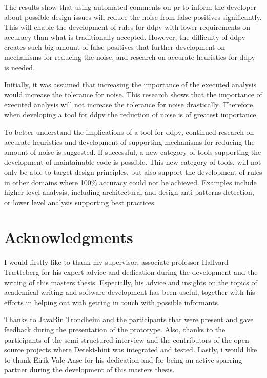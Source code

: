 \documentclass[pdftex,10pt,b5paper,twoside]{report}
\begin{document}
The results show that using automated comments on \gls{pr} to inform the developer about possible design issues will reduce the noise from false-positives significantly. This will enable the development of rules for \gls{ddpv} with lower requirements on accuracy than what is traditionally accepted. However, the difficulty of \gls{ddpv} creates such big amount of false-positives that further development on mechanisms for reducing the noise, and research on accurate heuristics for \gls{ddpv} is needed.

Initially, it was assumed that increasing the importance of the executed analysis would increase the tolerance for noise. This research shows that the importance of executed analysis will not increase the tolerance for noise drastically. Therefore, when developing a tool for \gls{ddpv} the reduction of noise is of greatest importance. 

To better understand the implications of a tool for \gls{ddpv}, continued research on accurate heuristics and development of supporting mechanisms for reducing the amount of noise is suggested. If successful, a new category of tools supporting the development of maintainable code is possible. This new category of tools, will not only be able to target design principles, but also support the development of rules in other domains where 100\% accuracy could not be achieved. Examples include higher level analysis, including architectural and design anti-patterns detection, or lower level analysis supporting best practices.

\section{Acknowledgments}
\label{acknowledgements}
I would firstly like to thank my supervisor, associate professor Hallvard Trætteberg for his expert advice and dedication during the development and the writing of this masters thesis. Especially, his advice and insights on the topics of academical writing and software development has been useful, together with his efforts in helping out with getting in touch with possible informants.

Thanks to JavaBin Trondheim and the participants that were present and gave feedback during the presentation of the prototype. Also, thanks to the participants of the semi-structured interview and the contributors of the open-source projects where Detekt-hint was integrated and tested. Lastly, i would like to thank Eirik Vale Aase for his dedication and for being an active sparring partner during the development of this masters thesis.

\printglossary[type=\acronymtype]
\printbibliography

\appendix
\label{appendix}

\end{document}
